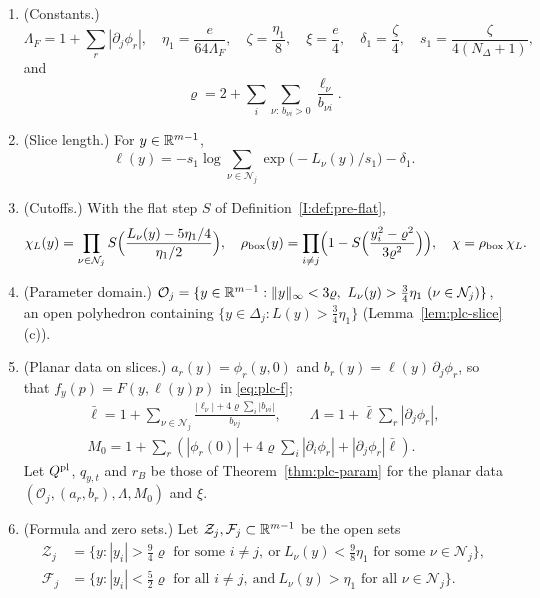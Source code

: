 \begin{definition}\label{def:plc-slice}
\begin{enumerate}[label=(\arabic*)]
\item (Constants.)
 \[
  \Lambda_F=1+\sum_r|\partial_j\phi_r|,\quad \eta_1=\frac e{64\Lambda_F},\quad \zeta=\frac{\eta_1}8,\quad
  \xi=\frac e4,\quad \delta_1=\frac\zeta4,\quad s_1=\frac\zeta{4(N_\Delta+1)},
 \]
 and
 \[
  \varrho=2+\sum_i\sum_{\nu:\,b_{\nu i}>0}\frac{\ell_\nu}{b_{\nu i}}.
 \]
\item (Slice length.) For $y\in\mathbb{R}^{m-1}$,
 \[
  \ell(y)=-s_1\log\sum_{\nu\in\mathcal N_j}\exp\bigl(-L_\nu(y)/s_1\bigr)-\delta_1 .
 \]
\item (Cutoffs.) With the flat step $S$ of Definition~\ref{I:def:pre-flat},
 \[
  \chi_L(y)=\prod_{\nu\in\mathcal N_j}S\Bigl(\frac{L_\nu(y)-5\eta_1/4}{\eta_1/2}\Bigr),\quad
  \rho_{\rm box}(y)=\prod_{i\ne j}\Bigl(1-S\Bigl(\frac{y_i^2-\varrho^2}{3\varrho^2}\Bigr)\Bigr),\quad
  \chi=\rho_{\rm box}\,\chi_L .
 \]
\item (Parameter domain.) $\mathcal O_j=\{y\in\R^{m-1}:\|y\|_\infty<3\varrho,\ L_\nu(y)>\frac34\eta_1\ (\nu\in\mathcal N_j)\}$, an open
 polyhedron containing $\{y\in\Delta_j:L(y)>\frac34\eta_1\}$ (Lemma~\ref{lem:plc-slice}(c)).
\item (Planar data on slices.) $a_r(y)=\phi_r(y,0)$ and $b_r(y)=\ell(y)\,\partial_j\phi_r$, so that $f_y(p)=F(y,\ell(y)p)$ in
 \eqref{eq:plc-f};
 \begin{gather*}
  \bar\ell=1+\sum_{\nu\in\mathcal N_j}
      \frac{|\ell_\nu|+4\varrho\sum_i|b_{\nu i}|}{b_{\nu j}},\qquad
  \Lambda=1+\bar\ell\sum_r|\partial_j\phi_r|,\\
  M_0=1+\sum_r\left(|\phi_r(0)|+4\varrho\sum_i|\partial_i\phi_r|
                              +|\partial_j\phi_r|\bar\ell\right).
 \end{gather*}
 Let $Q^{\rm pl}$, $q_{y,t}$ and $r_B$ be those of Theorem~\ref{thm:plc-param} for the planar data
 $(\mathcal O_j,(a_r,b_r),\Lambda,M_0)$ and $\xi$.
\item (Formula and zero sets.) Let $\mathcal Z_j,\mathcal F_j\subset\mathbb{R}^{m-1}$ be the open sets
 \begin{align*}
  \mathcal Z_j&=\bigl\{y:|y_i|>\tfrac94\varrho\text{ for some }i\ne j,\ \text{or}\ L_\nu(y)<\tfrac98\eta_1\text{ for some }\nu\in\mathcal N_j\bigr\},\\
  \mathcal F_j&=\bigl\{y:|y_i|<\tfrac52\varrho\text{ for all }i\ne j,\ \text{and}\ L_\nu(y)>\eta_1\text{ for all }\nu\in\mathcal N_j\bigr\}.

\end{align*}
\end{enumerate}
\end{definition}
